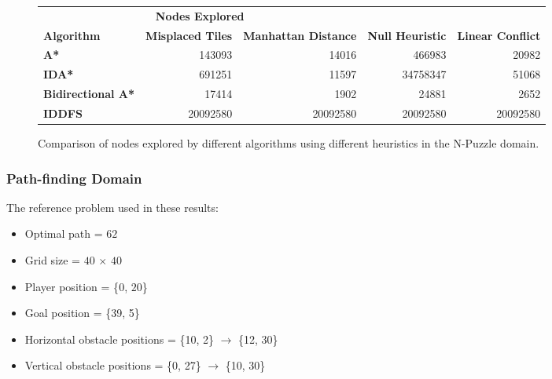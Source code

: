 \documentclass{article}
\begin{document}
\begin{figure}[]
    \centering
    
\begin{tabular}{@{}lrrrr@{}} \toprule
\multicolumn{3}{c}{\textbf{Nodes Explored}} \\ \cmidrule(r){2-5}
\textbf{Algorithm}        & \textbf{Misplaced Tiles} & \textbf{Manhattan Distance} & \textbf{Null Heuristic} & \textbf{Linear Conflict} \\ \midrule
\textbf{A*}               & 143093          & 14016              & 466983         & 20982           \\
\textbf{IDA*}             & 691251          & 11597              & 34758347       & 51068           \\
\textbf{Bidirectional A*} & 17414           & 1902               & 24881          & 2652            \\
\textbf{IDDFS}            & 20092580        & 20092580           & 20092580       & 20092580       \\\bottomrule
\end{tabular}
    \caption{Comparison of nodes explored by different algorithms using different heuristics in the N-Puzzle domain.}
    \label{table:N-Puzzle_comparison_nodes}
\end{figure}

\subsubsection{Path-finding Domain}
The reference problem used in these results:
\begin{itemize}
    \item Optimal path = $62$
    \item Grid size = $40$ $\times$ $40$
    \item Player position =  \{$0$, $20$\}
    \item Goal position =  \{39, 5\}
    \item Horizontal obstacle positions = \{10, 2\} $\longrightarrow$ \{12, 30\} 
    \item Vertical obstacle positions = \{0, 27\} $\longrightarrow$ \{10, 30\}
\end{itemize}
\end{document}
